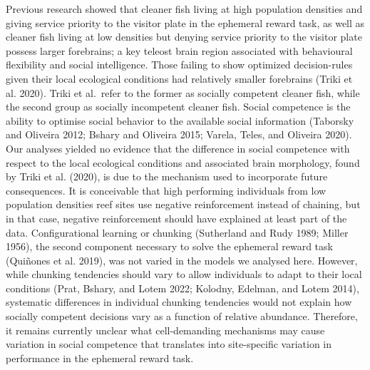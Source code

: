 \documentclass[
  12pt,
]{article}
\begin{document}
Previous research showed that cleaner fish living at high population
densities and giving service priority to the visitor plate in the
ephemeral reward task, as well as cleaner fish living at low densities
but denying service priority to the visitor plate possess larger
forebrains; a key teleost brain region associated with behavioural
flexibility and social intelligence. Those failing to show optimized
decision-rules given their local ecological conditions had relatively
smaller forebrains (Triki et al. 2020). Triki et al.~refer to the former
as socially competent cleaner fish, while the second group as socially
incompetent cleaner fish. Social competence is the ability to optimise
social behavior to the available social information (Taborsky and
Oliveira 2012; Bshary and Oliveira 2015; Varela, Teles, and Oliveira
2020). Our analyses yielded no evidence that the difference in social
competence with respect to the local ecological conditions and
associated brain morphology, found by Triki et al. (2020), is due to the
mechanism used to incorporate future consequences. It is conceivable
that high performing individuals from low population densities reef
sites use negative reinforcement instead of chaining, but in that case,
negative reinforcement should have explained at least part of the data.
Configurational learning or chunking (Sutherland and Rudy 1989; Miller
1956), the second component necessary to solve the ephemeral reward task
(Quiñones et al. 2019), was not varied in the models we analysed here.
However, while chunking tendencies should vary to allow individuals to
adapt to their local conditions (Prat, Bshary, and Lotem 2022; Kolodny,
Edelman, and Lotem 2014), systematic differences in individual chunking
tendencies would not explain how socially competent decisions vary as a
function of relative abundance. Therefore, it remains currently unclear
what cell-demanding mechanisms may cause variation in social competence
that translates into site-specific variation in performance in the
ephemeral reward task.
\end{document}
